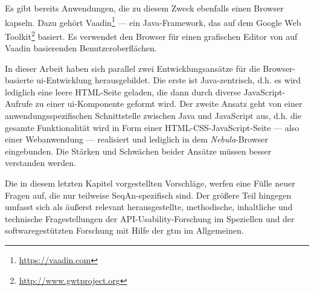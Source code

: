 Es gibt bereits Anwendungen, die zu diesem Zweck ebenfalls einen Browser kapseln. Dazu gehört Vaadin\footnote{\href{https://vaadin.com}{\url{https://vaadin.com}}} --- ein Java-Framework, das auf dem Google Web Toolkit\footnote{\href{http://www.gwtproject.org}{\url{http://www.gwtproject.org}}} basiert. Es verwendet den Browser für einen grafischen Editor von auf Vaadin basierenden Benutzeroberflächen.

In dieser Arbeit haben sich parallel zwei Entwicklungsansätze für die Browser-basierte \acrshort{ui}-Entwicklung herausgebildet. Die erste ist Java-zentrisch, d.h. es wird lediglich eine leere HTML-Seite geladen, die dann durch diverse JavaScript-Aufrufe zu einer \acrshort{ui}-Komponente geformt wird. Der zweite Ansatz geht von einer anwendungsspezifischen Schnittstelle zwischen Java und JavaScript aus, d.h. die gesamte Funktionalität wird in Form einer HTML-CSS-JavaScript-Seite --- also einer Webanwendung --- realisiert und lediglich in dem \textit{Nebula}-Browser eingebunden. Die Stärken und Schwächen beider Ansätze müssen besser verstanden werden.

\bigskip

Die in diesem letzten Kapitel vorgestellten Vorschläge, werfen eine Fülle neuer Fragen auf, die nur teilweise SeqAn-spezifisch sind. Der größere Teil hingegen umfasst sich als äußerst relevant herausgestellte, methodische, inhaltliche und technische Fragestellungen der API-Usability-Forschung im Speziellen und der softwaregestützten Forschung mit Hilfe der \gls{gtm} im Allgemeinen.

\cleardoublepage
